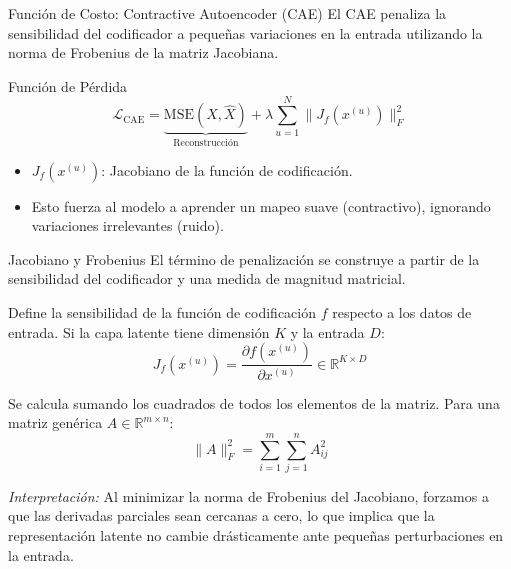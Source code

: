 \documentclass{beamer}
\begin{document}
\begin{frame}{Función de Costo: Contractive Autoencoder (CAE)}
	\small
	\justifying
	El CAE penaliza la sensibilidad del codificador a pequeñas variaciones en la entrada utilizando la norma de Frobenius de la matriz Jacobiana.
	
	\begin{block}{Función de Pérdida}
		\begin{equation*}
			\mathcal{L}_{\text{CAE}} = \underbrace{\text{MSE}(X, \hat{X})}_{\text{Reconstrucción}} + \lambda \sum_{u=1}^{N} \| J_f(x^{(u)}) \|_{F}^{2}
		\end{equation*}
	\end{block}
	
	\begin{itemize}
		\item $J_f(x^{(u)})$: Jacobiano de la función de codificación.
		\item Esto fuerza al modelo a aprender un mapeo suave (contractivo), ignorando variaciones irrelevantes (ruido).
	\end{itemize}
\end{frame}

\begin{frame}{Jacobiano y Frobenius}
	\small
	\justifying
	El término de penalización se construye a partir de la sensibilidad del codificador y una medida de magnitud matricial.
	
	\begin{block}{}
		Define la sensibilidad de la función de codificación $f$ respecto a los datos de entrada. Si la capa latente tiene dimensión $K$ y la entrada $D$:
		\begin{equation*}
			J_f(x^{(u)}) = 
			\frac{\partial f(x^{(u)})}{\partial x^{(u)}} 
			\in \mathbb{R}^{K \times D}
		\end{equation*}
	\end{block}
	
	\begin{block}{}
		Se calcula sumando los cuadrados de todos los elementos de la matriz. Para una matriz genérica $A \in \mathbb{R}^{m \times n}$:
		\begin{equation*}
			\|A\|_{F}^{2}
			=
			\sum_{i=1}^{m}
			\sum_{j=1}^{n}
			A_{ij}^{2}
		\end{equation*}
	\end{block}
	
	\footnotesize
	\textit{Interpretación:} Al minimizar la norma de Frobenius del Jacobiano, forzamos a que las derivadas parciales sean cercanas a cero, lo que implica que la representación latente no cambie drásticamente ante pequeñas perturbaciones en la entrada.
\end{frame}
\end{document}
